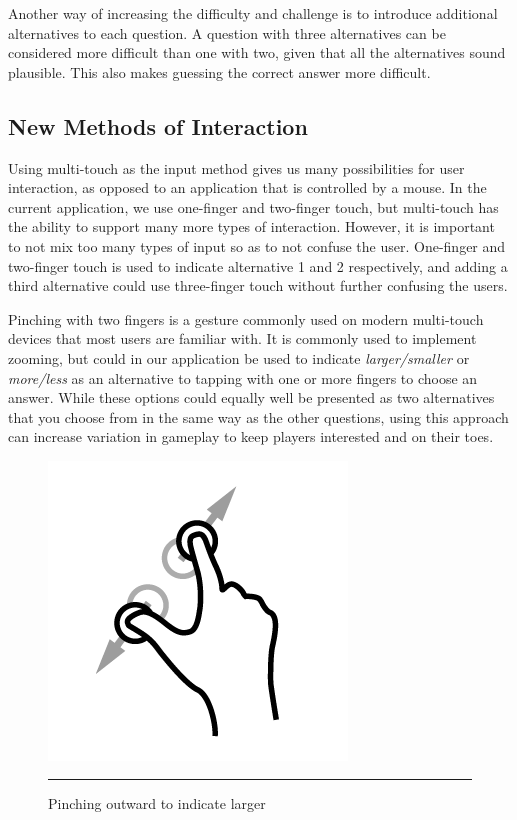 Another way of increasing the difficulty and challenge is to introduce additional alternatives to each question. A question with three alternatives can be considered more difficult than one with two, given that all the alternatives sound plausible. This also makes guessing the correct answer more difficult.


\subsection{New Methods of Interaction}

Using multi-touch as the input method gives us many possibilities for user interaction, as opposed to an application that is controlled by a mouse. In the current application, we use one-finger and two-finger touch, but multi-touch has the ability to support many more types of interaction. However, it is important to not mix too many types of input so as to not confuse the user. One-finger and two-finger touch is used to indicate alternative 1 and 2 respectively, and adding a third alternative could use three-finger touch without further confusing the users.

Pinching with two fingers is a gesture commonly used on modern multi-touch devices that most users are familiar with. It is commonly used to implement zooming, but could in our application be used to indicate \emph{larger/smaller} or \emph{more/less} as an alternative to tapping with one or more fingers to choose an answer. While these options could equally well be presented as two alternatives that you choose from in the same way as the other questions, using this approach can increase variation in gameplay to keep players interested and on their toes.

\begin{figure}[htbp]
	\centering
	\includegraphics{./Figures/pinch.png}
	\rule{35em}{0.5pt}
	\caption[Pinch]{Pinching outward to indicate larger}
	\label{fig:Pinch}
\end{figure}


